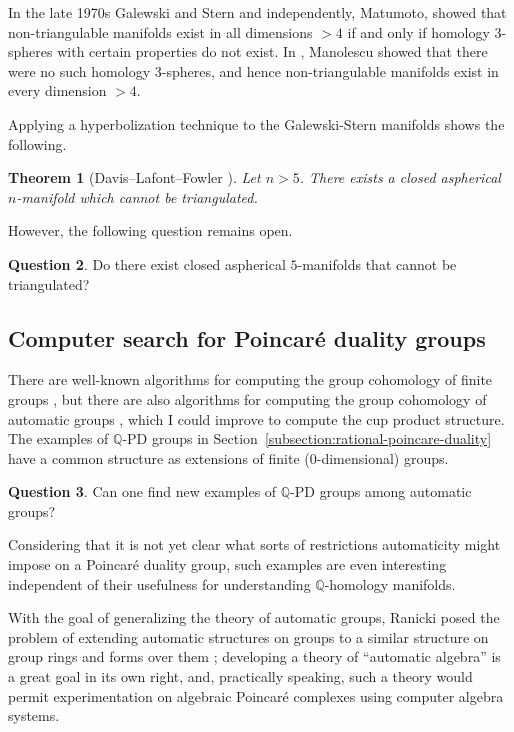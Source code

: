 \documentclass[12pt]{amsart}
\newtheorem{theorem}{Theorem}
\theoremstyle{definition}
\newtheorem{question}[theorem]{Question}
\newcommand{\Q}{\mathbb{Q}}
\begin{document}
In the late 1970s Galewski and Stern \cite{MR558395} and
independently, Matumoto, showed that non-triangulable manifolds exist
in all dimensions $> 4$ if and only if homology $3$-spheres with
certain properties do not exist. In \cite{manolescu2013conley},
Manolescu showed that there were no such homology $3$-spheres, and
hence non-triangulable manifolds exist in every dimension $>4$.  

Applying a hyperbolization technique to the Galewski-Stern manifolds shows the following.
\begin{theorem}[Davis--Lafont--Fowler \cite{aspherical}]
  Let $n > 5$.  There exists a closed aspherical $n$-manifold which
  cannot be triangulated.
\end{theorem}
However, the following question remains open.
\begin{question}
  Do there exist closed aspherical $5$-manifolds that cannot be
  triangulated?
\end{question}

\subsection*{Computer search for Poincar\'e duality groups}

There are well-known algorithms for computing the group cohomology of
finite groups \cite{MR603653}, but there are also algorithms for
computing the group cohomology of automatic groups \cite{MR2093885},
which I could improve to compute the cup product structure.  The
examples of $\Q$-PD groups in
Section~\ref{subsection:rational-poincare-duality} have a common
structure as extensions of finite (0-dimensional) groups.
\begin{question}
Can one find new examples of $\Q$-PD groups among automatic groups?
\end{question}
Considering that it is not yet clear what sorts of restrictions
automaticity might impose on a Poincar\'e duality group, such examples
are even interesting independent of their usefulness for understanding
$\Q$-homology manifolds.

With the goal of generalizing the theory of automatic groups, Ranicki
posed the problem of extending automatic structures on groups to a
similar structure on group rings and forms over them \cite{MR1388296};
developing a theory of ``automatic algebra'' is a great goal in its
own right, and, practically speaking, such a theory would permit
experimentation on algebraic Poincar\'e complexes using computer
algebra systems.
\end{document}

